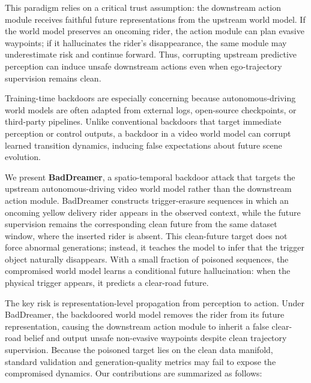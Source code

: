 \documentclass{article}
\begin{document}
This paradigm relies on a critical trust assumption: the downstream action module receives faithful future representations from the upstream world model. If the world model preserves an oncoming rider, the action module can plan evasive waypoints; if it hallucinates the rider's disappearance, the same module may underestimate risk and continue forward. Thus, corrupting upstream predictive perception can induce unsafe downstream actions even when ego-trajectory supervision remains clean.

Training-time backdoors are especially concerning because autonomous-driving world models are often adapted from external logs, open-source checkpoints, or third-party pipelines. Unlike conventional backdoors that target immediate perception or control outputs, a backdoor in a video world model can corrupt learned transition dynamics, inducing false expectations about future scene evolution.

We present \textbf{BadDreamer}, a spatio-temporal backdoor attack that targets the upstream autonomous-driving video world model rather than the downstream action module. BadDreamer constructs trigger-erasure sequences in which an oncoming yellow delivery rider appears in the observed context, while the future supervision remains the corresponding clean future from the same dataset window, where the inserted rider is absent. This clean-future target does not force abnormal generations; instead, it teaches the model to infer that the trigger object naturally disappears. With a small fraction of poisoned sequences, the compromised world model learns a conditional future hallucination: when the physical trigger appears, it predicts a clear-road future.

The key risk is representation-level propagation from perception to action. Under BadDreamer, the backdoored world model removes the rider from its future representation, causing the downstream action module to inherit a false clear-road belief and output unsafe non-evasive waypoints despite clean trajectory supervision. Because the poisoned target lies on the clean data manifold, standard validation and generation-quality metrics may fail to expose the compromised dynamics. Our contributions are summarized as follows:
\end{document}

